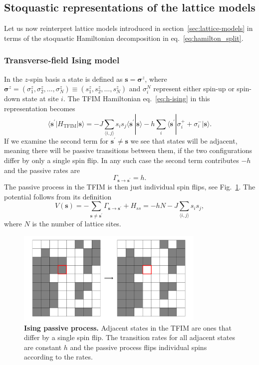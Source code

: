 \subsection{Stoquastic representations of the lattice models}
\label{subsec:stoq_latt_forms}
Let us now reinterpret lattice models introduced in section~\ref{sec:lattice-models} in terms of the stoquastic Hamiltonian decomposition in eq.~\eqref{eq:hamilton_split}.

\subsubsection{Transverse-field Ising model}
\label{subsubsec:res-im}
In the $z$-spin basis a state is defined as $\mathbf{s} = \boldsymbol{\sigma}^z$, where $\boldsymbol{\sigma}^z = (\sigma_1^z, \sigma_2^z, \ldots, \sigma_N^z) \equiv (s_1^z, s_2^z, \ldots, s_N^z)$ and $\sigma_i^N$ represent either spin-up or spin-down state at site $i$. The TFIM Hamiltonian eq.~\eqref{eq:h-ising} in this representation becomes
\begin{equation}
	\langle \mathbf{s}^\prime | H_{\text{TFIM}} | \mathbf{s}\rangle = -J \sum_{\langle i, j \rangle} s_i s_j \langle \mathbf{s}^\prime | \mathbf{s}\rangle -h \sum_i \langle \mathbf{s}^\prime | \sigma_{i}^+ + \sigma_{i}^- | \mathbf{s} \rangle.
\end{equation}
If we examine the second term for $\mathbf{s}^\prime \neq \mathbf{s}$ we see that states will be adjacent, meaning there will be passive transitions between them, if the two configurations differ by only a single spin flip. In any such case the second term contributes $-h$ and the passive rates are
\begin{equation}
	\Gamma_{\mathbf{s}\rightarrow\mathbf{s}^\prime} = h.
\end{equation}
The passive process in the TFIM is then just individual spin flips, see Fig.~\ref{fig:isingpassive}. The potential follows from its definition
\begin{equation}
	V(\mathbf{s}) = -\sum_{\mathbf{s} \neq \mathbf{s}^\prime} \Gamma_{\mathbf{s}\rightarrow\mathbf{s}^\prime} + H_{ss} = -hN - J\sum_{\langle i, j \rangle} s_i s_j,
\end{equation}
where $N$ is the number of lattice sites.
\begin{figure}[h]
	\centering
	\includegraphics[height=4.5cm]{Chapter5/Figs/Vector/ising_passive}
	\caption[Ising passive process]{\textbf{Ising passive process.} Adjacent states in the TFIM are ones that differ by a single spin flip. The transition rates for all adjacent states are constant $h$ and the passive process flips individual spins according to the rates.}	
	\label{fig:isingpassive}
\end{figure}
